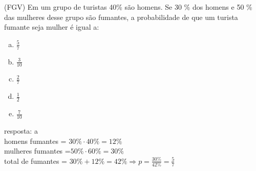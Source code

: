 \begin{ex}
 (FGV) Em um grupo de turistas 40\% são homens. Se 30 \% dos homens e 50 \% das mulheres desse grupo são fumantes, a probabilidade de  que um turista fumante seja mulher é igual a: 
    \begin{enumerate}[(a)]
    \item $\frac{5}{7}$
    \item $\frac{3}{10}$
    \item $\frac{2}{7}$
    \item $\frac{1}{2}$
    \item $\frac{7}{10}$
    \end{enumerate}
      \begin{sol}
       resposta: a  \\
       homens fumantes = $30\%\cdot40\%=12\%$\\
       mulheres fumantes =$50\%\cdot60\%=30\% $ \\
       total de fumantes = $30\%+12\%=42\%\Longrightarrow p=\frac{30\%}{42\%}=\frac{5}{7}$
      \end{sol}
\end{ex}